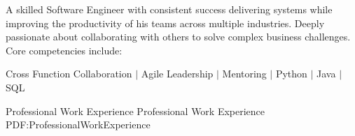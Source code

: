 \documentclass[letterpaper,MMMMyyyy,nonstopmode]{simpleresumecv}
\newcommand{\comment}[1]{\ignorespaces} %
\begin{document}
\begin{Body}




A skilled Software Engineer with consistent success delivering systems while improving the productivity of his teams across multiple industries.
Deeply passionate about collaborating with others to solve complex business challenges. 
Core competencies include:


\iffalse
\Entry
Full Stack/Backend Java architect, developer, and consultant, specializing in Java/Oracle/JavaScript
solutions and integrations. 
\fi
\Gap
\begin{center}
Cross Function Collaboration $|$ \comment{System Design $|$ } \comment{Linux $|$} Agile Leadership $|$ Mentoring $|$ Python $|$ Java $|$ SQL 
\end{center}


\Section
{Professional\newline
Work Experience}
{Professional Work Experience}
{PDF:ProfessionalWorkExperience}


\end{Body}
\end{document}
